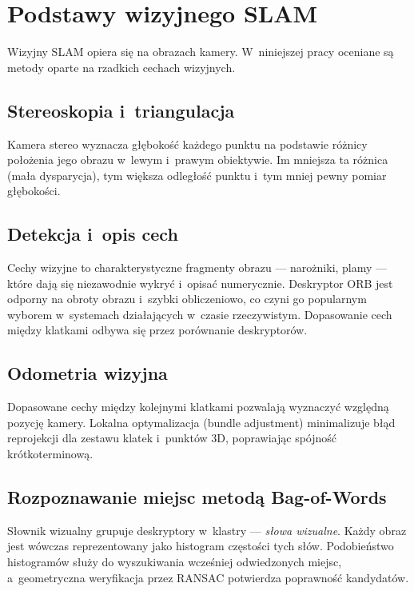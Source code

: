 \section{Podstawy wizyjnego SLAM}

Wizyjny SLAM opiera się na obrazach kamery.
W~niniejszej pracy oceniane są metody oparte na rzadkich cechach wizyjnych.

\subsection{Stereoskopia i~triangulacja}

Kamera stereo wyznacza głębokość każdego punktu na podstawie różnicy
położenia jego obrazu w~lewym i~prawym obiektywie.
Im mniejsza ta różnica (mała dysparycja), tym większa odległość punktu
i~tym mniej pewny pomiar głębokości.

\subsection{Detekcja i~opis cech}

Cechy wizyjne to charakterystyczne fragmenty obrazu --- narożniki, plamy ---
które dają się niezawodnie wykryć i~opisać numerycznie.
Deskryptor ORB jest odporny na obroty obrazu i~szybki obliczeniowo,
co czyni go popularnym wyborem w~systemach działających w~czasie rzeczywistym.
Dopasowanie cech między klatkami odbywa się przez porównanie deskryptorów.

\subsection{Odometria wizyjna}

Dopasowane cechy między kolejnymi klatkami pozwalają wyznaczyć względną
pozycję kamery.
Lokalna optymalizacja (bundle adjustment) minimalizuje błąd reprojekcji
dla zestawu klatek i~punktów 3D, poprawiając spójność krótkoterminową.

\subsection{Rozpoznawanie miejsc metodą Bag-of-Words}

Słownik wizualny grupuje deskryptory w~klastry --- \textit{słowa wizualne}.
Każdy obraz jest wówczas reprezentowany jako histogram częstości tych słów.
Podobieństwo histogramów służy do wyszukiwania wcześniej odwiedzonych miejsc,
a~geometryczna weryfikacja przez RANSAC potwierdza poprawność kandydatów.

